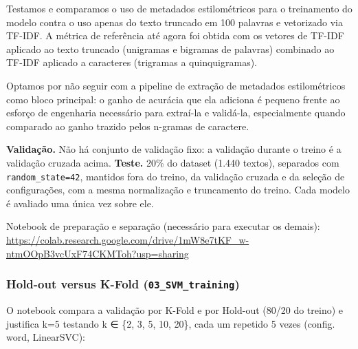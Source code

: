 \documentclass[
  brazilian,
  11pt,
]{article}
\begin{document}
Testamos e comparamos o uso de metadados estilométricos para o treinamento do modelo contra o uso apenas do texto truncado em 100 palavras e vetorizado via TF-IDF. A métrica de referência até agora foi obtida com os vetores de TF-IDF aplicado ao texto truncado (unigramas e bigramas de palavras) combinado ao TF-IDF aplicado a caracteres (trigramas a quinquigramas).

Optamos por não seguir com a pipeline de extração de metadados estilométricos como bloco principal: o ganho de acurácia que ela adiciona é pequeno frente ao esforço de engenharia necessário para extraí-la e validá-la, especialmente quando comparado ao ganho trazido pelos n-gramas de caractere.

\textbf{Validação.} Não há conjunto de validação fixo: a validação durante o treino é a validação cruzada acima. \textbf{Teste.} 20\% do dataset (1.440 textos), separados com \texttt{random\_state=42}, mantidos fora do treino, da validação cruzada e da seleção de configurações, com a mesma normalização e truncamento do treino. Cada modelo é avaliado uma única vez sobre ele.

Notebook de preparação e separação (necessário para executar os demais): \url{https://colab.research.google.com/drive/1mW8e7tKF_w-ntmOOpB3vcUxF74CKMToh?usp=sharing}

\subsubsection{\texorpdfstring{Hold-out versus K-Fold (\texttt{03\_SVM\_training})}{Hold-out versus K-Fold (03\_SVM\_training)}}\label{hold-out-versus-k-fold-03_svm_training}

O notebook compara a validação por K-Fold e por Hold-out (80/20 do treino) e justifica k=5 testando k ∈ \{2, 3, 5, 10, 20\}, cada um repetido 5 vezes (config. word, LinearSVC):
\end{document}
